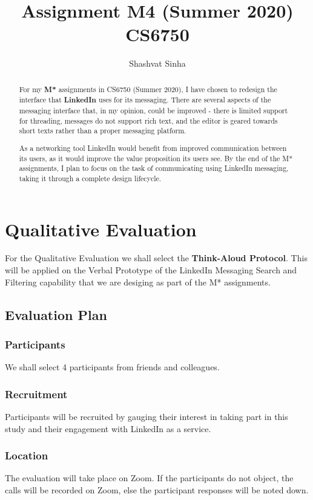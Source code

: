 \documentclass[
	letterpaper, %
]{jdf}
\author{Shashvat Sinha}
\title{Assignment M4 (Summer 2020)\\CS6750}
\begin{document}

\maketitle

\begin{abstract}
    For my \textbf{M*} assignments in CS6750 (Summer 2020), I have chosen to redesign the interface that \textbf{LinkedIn} uses for its messaging. There are several aspects of the messaging interface that, in my opinion, could be improved - there is limited support for threading, messages do not support rich text, and the editor is geared towards short texts rather than a proper messaging platform. 
    
    As a networking tool LinkedIn would benefit from improved communication between its users, as it would improve the value proposition its users see. By the end of the M* assignments, I plan to focus on the task of communicating using LinkedIn messaging, taking it  through a complete design lifecycle. 
\end{abstract}

\section{Qualitative Evaluation}
For the Qualitative Evaluation we shall select the \textbf{Think-Aloud Protocol}. This will be applied on the Verbal Prototype of the LinkedIn Messaging Search and Filtering capability that we are desiging as part of the M* assignments.

\subsection{Evaluation Plan}
\subsubsection{Participants}
We shall select 4 participants from friends and colleagues. 

\subsubsection{Recruitment}Participants will be recruited by gauging their interest in taking part in this study and their engagement with LinkedIn as a service.

\subsubsection{Location}
The evaluation will take place on Zoom. If the participants do not object, the calls will be recorded on Zoom, else the participant responses will be noted down.
\end{document}

